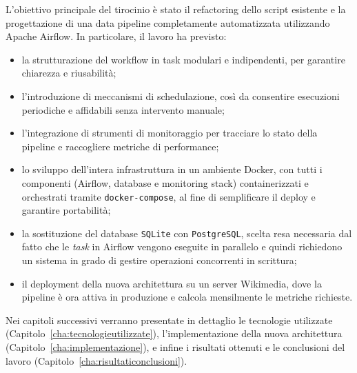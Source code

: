 L’obiettivo principale del tirocinio è stato il refactoring dello script esistente e la progettazione di una data pipeline completamente automatizzata utilizzando Apache Airflow. In particolare, il lavoro ha previsto:

\begin{itemize}
\item la strutturazione del workflow in task modulari e indipendenti, per garantire chiarezza e riusabilità;
\item l’introduzione di meccanismi di schedulazione, così da consentire esecuzioni periodiche e affidabili senza intervento manuale;
\item l’integrazione di strumenti di monitoraggio per tracciare lo stato della pipeline e raccogliere metriche di performance;
\item lo sviluppo dell’intera infrastruttura in un ambiente Docker, con tutti i componenti (Airflow, database e monitoring stack) containerizzati e orchestrati tramite \texttt{docker-compose}, al fine di semplificare il deploy e garantire portabilità;
\item la sostituzione del database \texttt{SQLite} con \texttt{PostgreSQL}, scelta resa necessaria dal fatto che le \textit{task} in Airflow vengono eseguite in parallelo e quindi richiedono un sistema in grado di gestire operazioni concorrenti in scrittura;
\item il deployment della nuova architettura su un server Wikimedia, dove la pipeline è ora attiva in produzione e calcola mensilmente le metriche richieste.
\end{itemize}

Nei capitoli successivi verranno presentate in dettaglio le tecnologie utilizzate (Capitolo~\ref{cha:tecnologieutilizzate}), l’implementazione della nuova architettura (Capitolo~\ref{cha:implementazione}), e infine i risultati ottenuti e le conclusioni del lavoro (Capitolo~\ref{cha:risultaticonclusioni}).

\clearpage